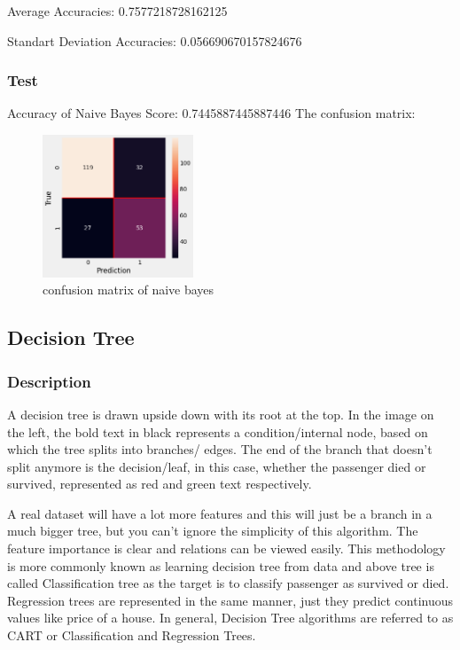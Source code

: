 \documentclass[11pt,en]{elegantpaper}
\begin{document}
Average Accuracies:  0.7577218728162125

Standart Deviation Accuracies:  0.056690670157824676

\subsubsection{Test}
Accuracy of Naive Bayes Score:  0.7445887445887446
The confusion matrix:
\begin{figure}[H]
    \centering
    \includegraphics[width=0.4\textwidth]{figure/conmat-nb.png}
    \caption{confusion matrix of naive bayes}
\end{figure}

\subsection{Decision Tree}
\subsubsection{Description}
A decision tree is drawn upside down with its root at the top. In the image on the left, the bold text in black represents a condition/internal node, based on which the tree splits into branches/ edges. The end of the branch that doesn’t split anymore is the decision/leaf, in this case, whether the passenger died or survived, represented as red and green text respectively.

A real dataset will have a lot more features and this will just be a branch in a much bigger tree, but you can’t ignore the simplicity of this algorithm. The feature importance is clear and relations can be viewed easily. This methodology is more commonly known as learning decision tree from data and above tree is called Classification tree as the target is to classify passenger as survived or died. Regression trees are represented in the same manner, just they predict continuous values like price of a house. In general, Decision Tree algorithms are referred to as CART or Classification and Regression Trees.
\end{document}
